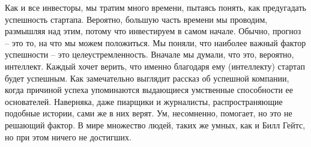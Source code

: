 \documentclass[ebook,12pt,oneside,openany]{memoir}
\date{}
\begin{document}
\maketitle

Как и все инвесторы, мы тратим много времени, пытаясь понять, как
предугадать успешность стартапа. Вероятно, большую часть времени мы
проводим, размышляя над этим, потому что инвестируем в самом начале.
Обычно, прогноз – это то, на что мы можем положиться. Мы поняли, что
наиболее важный фактор успешности – это целеустремленность. Вначале мы
думали, что это, вероятно, интеллект. Каждый хочет верить, что именно
благодаря ему (интеллекту) стартап будет успешным. Как замечательно
выглядит рассказ об успешной компании, когда причиной успеха
упоминаются выдающиеся умственные способности ее основателей.
Наверняка, даже пиарщики и журналисты, распространяющие подобные
истории, сами же в них верят. Ум, несомненно, помогает, но это не
решающий фактор. В мире множество людей, таких же умных, как и Билл
Гейтс, но при этом ничего не достигших.
\end{document}
